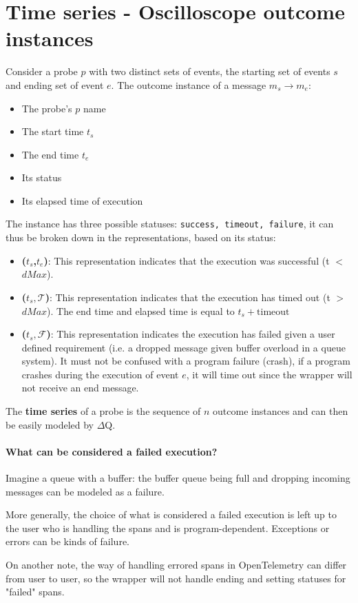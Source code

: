 \section{Time series - Oscilloscope outcome instances}
    Consider a probe $p$ with two distinct sets of events, the starting set of events $s$ and ending set of event $e$. The outcome instance of a message $m_s \rightarrow m_e$:
    \begin{itemize}
        \item The probe's $p$ name
        \item The start time $t_s$
        \item The end time $t_e$
        \item Its status 
        \item Its elapsed time of execution
    \end{itemize}
    The instance has three possible statuses: \texttt{success, timeout, failure}, it can thus be broken down in the representations, based on its status:
    \begin{itemize}
        \item \textbf{($t_s$,$t_e$)}: This representation indicates that the execution was successful (t $<$ $dMax$). 
        \item \textbf{($t_s, \mathcal{T}$)}: This representation indicates that the execution has timed out (t $>$ $dMax$). The end time and elapsed time is equal to $t_s + \text{timeout}$ 
        \item \textbf{($t_s, \mathcal{F}$)}: This representation indicates the execution has failed given a user defined requirement (i.e. a dropped message given buffer overload in a queue system). It must not be confused with a program failure (crash), if a program crashes during the execution of event $e$, it will time out since the wrapper will not receive an end message.
    \end{itemize}
    The \textbf{time series} of a probe is the sequence of $n$ outcome instances and can then be easily modeled by $\Delta$Q.

    \paragraph{What can be considered a failed execution?} Imagine a queue with a buffer: the buffer queue being full and dropping incoming messages can be modeled as a failure.

    More generally, the choice of what is considered a failed execution is left up to the user who is handling the spans and is program-dependent. Exceptions or errors can be kinds of failure. 

    On another note, the way of handling errored spans in OpenTelemetry can differ from user to user, so the wrapper will not handle ending and setting statuses for "failed" spans.
   
